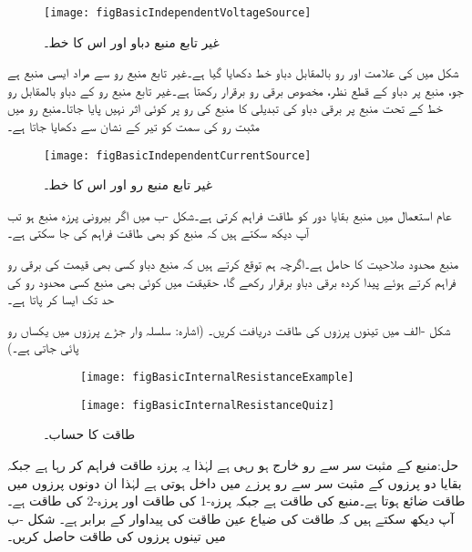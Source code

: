 \begin{figure}
\centering
\texttt{[image: figBasicIndependentVoltageSource]}
\caption{غیر تابع منبع دباو اور اس کا  خط۔}
\label{شکل_بنیادی_آزاد_منبع_دباو}
\end{figure}

شکل  میں  کی علامت اور رو بالمقابل دباو  خط دکھایا گیا ہے۔غیر تابع منبع رو سے مراد ایسی منبع ہے جو، منبع پر دباو کے قطع نظر،  مخصوص برقی رو برقرار رکھتا ہے۔غیر تابع منبع رو کے دباو بالمقابل رو خط کے تحت منبع پر برقی دباو کی تبدیلی کا منبع کی رو پر کوئی اثر نہیں پایا جاتا۔منبع رو میں مثبت رو کی سمت کو تیر کے نشان سے دکھایا جاتا ہے۔
\begin{figure}
\centering
\texttt{[image: figBasicIndependentCurrentSource]}
\caption{غیر تابع منبع رو اور اس کا  خط۔}
\label{شکل_بنیادی_آزاد_منبع_رو}
\end{figure}

عام استعمال میں منبع بقایا دور کو طاقت فراہم کرتی ہے۔شکل -ب میں اگر بیرونی پرزہ منبع ہو تب آپ دیکھ سکتے ہیں کہ منبع کو بھی طاقت فراہم کی جا سکتی ہے۔

منبع محدود صلاحیت کا حامل ہے۔اگرچہ ہم توقع کرتے ہیں کہ منبع دباو کسی بھی قیمت کی برقی رو فراہم کرتے ہوئے پیدا کردہ  برقی دباو برقرار رکھے گا، حقیقت میں کوئی بھی منبع کسی محدود رو کی حد تک ایسا کر پاتا ہے۔

شکل -الف میں تینوں پرزوں کی طاقت دریافت کریں۔ (اشارہ: سلسلہ وار جڑے پرزوں میں یکساں رو پائی جاتی ہے۔)
\begin{figure}
\centering
\begin{subfigure}{0.5\textwidth}
\centering
\texttt{[image: figBasicInternalResistanceExample]}
\caption{}
\end{subfigure}%
%
\begin{subfigure}{0.5\textwidth}
\centering
\texttt{[image: figBasicInternalResistanceQuiz]}
\caption{}
\end{subfigure}%
\caption{طاقت کا حساب۔}
\label{شکل_بنیادی_طاقت_حساب}
\end{figure}

حل:منبع کے مثبت سر سے رو خارج ہو رہی ہے لہٰذا یہ پرزہ طاقت فراہم کر رہا ہے جبکہ بقایا دو پرزوں کے مثبت سر سے رو پرزے میں داخل ہوتی ہے لہٰذا ان دونوں پرزوں میں طاقت ضائع ہوتا ہے۔منبع کی طاقت  ہے جبکہ پرزہ-1 کی طاقت  اور پرزہ-2 کی طاقت  ہے۔آپ دیکھ سکتے ہیں کہ طاقت کی ضیاع  عین طاقت کی پیداوار کے برابر ہے۔
شکل -ب میں تینوں پرزوں کی طاقت حاصل کریں۔

